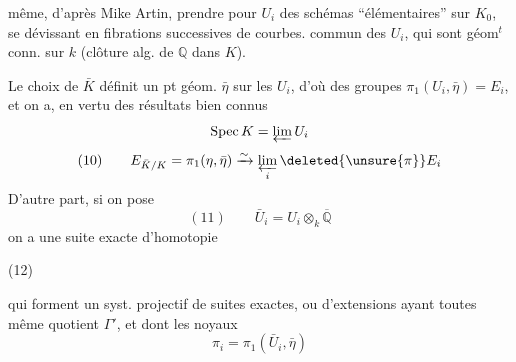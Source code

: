 même, d'après Mike Artin, prendre pour $U_i$ des schémas ``élémentaires'' sur $K_0$, se dévissant en fibrations successives de courbes.   commun des $U_i$, qui sont géom$^t$ conn.  sur  $k$ (clôture alg. de $\mathbb Q$ dans $K$).

Le choix de $\bar K$ définit un pt géom. $\bar\eta$ sur les $U_i$, d'où des groupes $\pi_1(U_i,\bar\eta)=E_i$, et on a, en vertu des résultats bien connus
\[
\operatorname{Spec}K=\varprojlim U_i
\]
\[
(10)\qquad E_{\bar K/K}=\pi_1(\eta,\bar\eta)\xrightarrow{\sim}\varprojlim_i\deleted{\unsure{\pi}}E_i
\]
D'autre part, si on pose
\[
(11)\qquad\bar U_i=U_i\otimes_k\overline{\mathbb Q}
\]
on a  une suite exacte d'homotopie

\noindent (12)\quad{}

qui forment un syst. projectif de suites exactes, ou d'extensions ayant toutes même quotient $\Gamma'$, et dont les noyaux
\[
\pi_i=\pi_1(\bar U_i,\bar\eta)
\]
